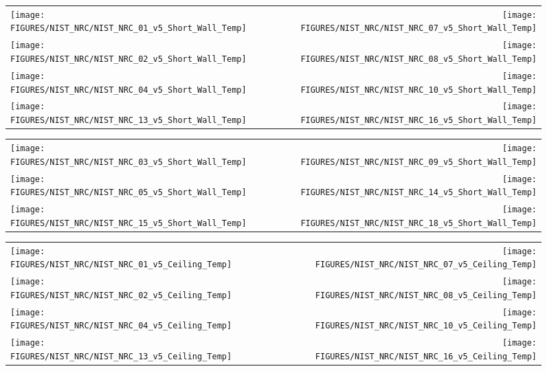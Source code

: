 \begin{figure}[h!]
\begin{tabular*}{\textwidth}{l@{\extracolsep{\fill}}r}
\texttt{[image: FIGURES/NIST\_NRC/NIST\_NRC\_01\_v5\_Short\_Wall\_Temp]} &
\texttt{[image: FIGURES/NIST\_NRC/NIST\_NRC\_07\_v5\_Short\_Wall\_Temp]} \\
\texttt{[image: FIGURES/NIST\_NRC/NIST\_NRC\_02\_v5\_Short\_Wall\_Temp]} &
\texttt{[image: FIGURES/NIST\_NRC/NIST\_NRC\_08\_v5\_Short\_Wall\_Temp]} \\
\texttt{[image: FIGURES/NIST\_NRC/NIST\_NRC\_04\_v5\_Short\_Wall\_Temp]} &
\texttt{[image: FIGURES/NIST\_NRC/NIST\_NRC\_10\_v5\_Short\_Wall\_Temp]} \\
\texttt{[image: FIGURES/NIST\_NRC/NIST\_NRC\_13\_v5\_Short\_Wall\_Temp]} &
\texttt{[image: FIGURES/NIST\_NRC/NIST\_NRC\_16\_v5\_Short\_Wall\_Temp]}
\end{tabular*}
\label{NIST_NRC_Short_Wall_Temp_Closed}
\end{figure}

\begin{figure}[h!]
\begin{tabular*}{\textwidth}{l@{\extracolsep{\fill}}r}
\texttt{[image: FIGURES/NIST\_NRC/NIST\_NRC\_03\_v5\_Short\_Wall\_Temp]} &
\texttt{[image: FIGURES/NIST\_NRC/NIST\_NRC\_09\_v5\_Short\_Wall\_Temp]} \\
\texttt{[image: FIGURES/NIST\_NRC/NIST\_NRC\_05\_v5\_Short\_Wall\_Temp]} &
\texttt{[image: FIGURES/NIST\_NRC/NIST\_NRC\_14\_v5\_Short\_Wall\_Temp]} \\
\texttt{[image: FIGURES/NIST\_NRC/NIST\_NRC\_15\_v5\_Short\_Wall\_Temp]} &
\texttt{[image: FIGURES/NIST\_NRC/NIST\_NRC\_18\_v5\_Short\_Wall\_Temp]}
\end{tabular*}
\label{NIST_NRC_Short_Wall_Temp_Open}
\end{figure}

\clearpage



\begin{figure}[h!]
\begin{tabular*}{\textwidth}{l@{\extracolsep{\fill}}r}
\texttt{[image: FIGURES/NIST\_NRC/NIST\_NRC\_01\_v5\_Ceiling\_Temp]} &
\texttt{[image: FIGURES/NIST\_NRC/NIST\_NRC\_07\_v5\_Ceiling\_Temp]} \\
\texttt{[image: FIGURES/NIST\_NRC/NIST\_NRC\_02\_v5\_Ceiling\_Temp]} &
\texttt{[image: FIGURES/NIST\_NRC/NIST\_NRC\_08\_v5\_Ceiling\_Temp]} \\
\texttt{[image: FIGURES/NIST\_NRC/NIST\_NRC\_04\_v5\_Ceiling\_Temp]} &
\texttt{[image: FIGURES/NIST\_NRC/NIST\_NRC\_10\_v5\_Ceiling\_Temp]} \\
\texttt{[image: FIGURES/NIST\_NRC/NIST\_NRC\_13\_v5\_Ceiling\_Temp]} &
\texttt{[image: FIGURES/NIST\_NRC/NIST\_NRC\_16\_v5\_Ceiling\_Temp]}
\end{tabular*}
\label{NIST_NRC_Ceiling_Temp_Closed}
\end{figure}


